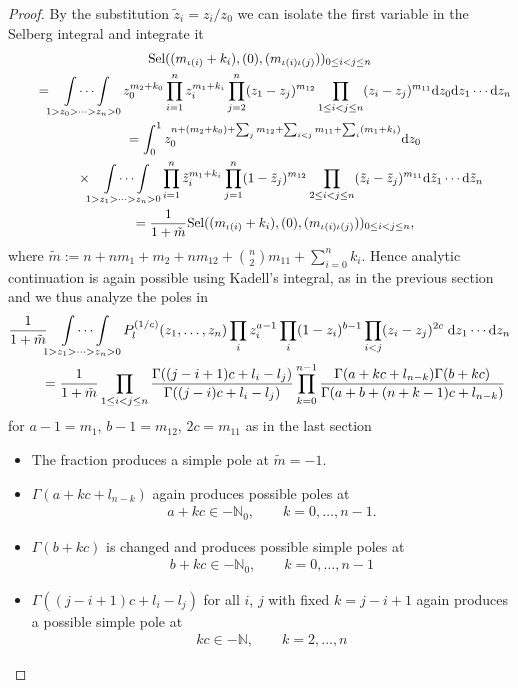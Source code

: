 \documentclass[pdftex]{sigma}%
\numberwithin{equation}{section}
\newcommand{\N}{\mathbb{N}}
\renewcommand{\d}{\mathrm{d}}
\newcommand{\Sel}{\mathrm{Sel}}
\begin{document}
\begin{proof}By the substitution $\tilde{z}_i=z_i/z_0$ we can isolate the first variable in the Selberg integral and integrate it
\begin{gather*}
 \Sel((m_{\iota(i)}+k_i),(0), (m_{\iota(i)\iota(j)}))_{0\leq i<j\leq n}\\
\qquad{} =\idotsint\limits_{1> z_0>\cdots >z_n> 0} z_0^{m_2+k_0} \prod_{i=1}^n z_i^{m_1+k_i} \prod_{j=2}^{n} (z_1 - z_j)^{m_{12}} \prod\limits_{1 \leq i < j \leq n} (z_i - z_j)^{m_{11}}  \d z_0 \d z_1 \cdots \d z_n\\
\qquad{} =\int_0^1 z_0^{n+(m_2+k_0) + \sum_j m_{12} + \sum_{i<j} m_{11} + \sum_i (m_1+k_i)} \d z_0\\
\qquad\quad{}\times  \idotsint\limits_{1> z_1>\cdots >z_n > 0} \prod_{i=1}^n \tilde{z}_i^{m_1+k_i} \prod_{j=1}^{n} (1 - \tilde{z}_j)^{m_{12}} \prod_{2 \leq i < j \leq n} (\tilde{z}_i - \tilde{z}_j)^{m_{11}}  \d\tilde{z}_1 \cdots \d\tilde{z}_n\\
\qquad{} =\frac{1}{1+\tilde{m}}
  \Sel((m_{\iota(i)}+k_i),(0), (m_{\iota(i)\iota(j)}))_{0\leq i<j\leq n},
\end{gather*} 	
where $\tilde{m}:=n+ nm_1+m_2 + nm_{12} + {n\choose 2} m_{11}+\sum_{i=0}^n k_i$. Hence analytic continuation is again possible using Kadell's integral, as in the previous section and we thus analyze the poles in
\begin{gather*}
 \frac{1}{1+\tilde{m}}\idotsint\displaylimits_{1> z_1>\dots >z_{n}> 0}
P_{l}^{(1/c)}(z_1,\dots, z_n)\prod_i z_i^{a-1}\prod_i (1-z_i)^{b-1}\prod_{i<j} (z_i-z_j)^{2c} \;\d z_1\cdots \d z_{n}\\
\qquad{} =\frac{1}{1+\tilde{m}}\prod_{1\leq i<j\leq n}\frac{\Gamma((j-i+1)c+l_i-l_j)}
{\Gamma((j-i)c+l_i-l_j)}
\prod_{k=0}^{n-1}
\frac{\Gamma(a+kc+l_{n-k})\Gamma(b+kc)}
{\Gamma(a+b+(n+k-1)c+l_{n-k})}
\end{gather*}
for $a-1=m_1$, $b-1=m_{12}$, $2c=m_{11}$ as in the last section
	\begin{itemize}\itemsep=0pt
	\item The fraction produces a simple pole at $\tilde{m}=-1$.
	\item $\Gamma(a+kc+l_{n-k})$ again produces possible poles at
	\begin{gather*}
	a+ k c  \in -\N_0,  \qquad k=0,\dots,n-1.
	\end{gather*}
	\item $\Gamma(b+kc)$ is changed and produces possible simple poles at
	\begin{gather*}
	b+kc  \in -\N_0,  \qquad k=0,\dots,n-1
	\end{gather*}
	\item $\Gamma((j-i+1)c+l_i-l_j)$ for all $i$, $j$ with fixed $k=j-i+1$ again produces a possible simple pole at
	\begin{gather*}
	kc  \in -\N,  \qquad k=2,\dots,n\tag*{\qed}
	\end{gather*}
\end{itemize}\renewcommand{\qed}{} 	
\end{proof}
\end{document}
